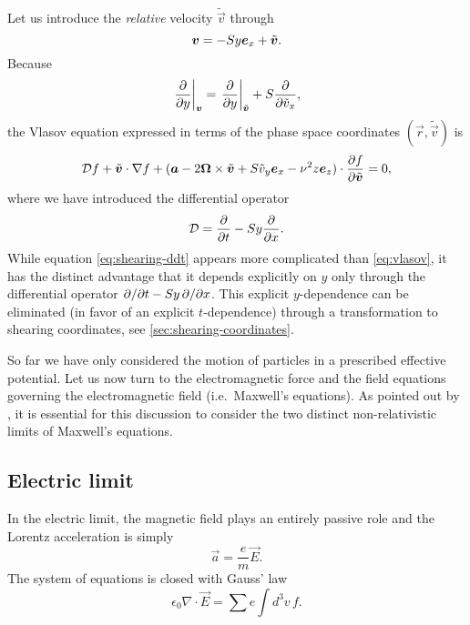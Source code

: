 \documentclass[aps,pre,notitlepage,amsmath,amssymb,amsfonts,nobibnotes,nofootinbib,superscriptaddress,onecolumn,a4paper,10pt]{revtex4-1}
\newcommand{\tvec}[1]{\tilde{\vec{#1}}}
\begin{document}
Let us introduce the \emph{relative} velocity $\tvec{v}$ through
\begin{equation}
  \label{eq:relative-velocity}
  \vec{v} = -Sy\ex + \tvec{v}.
\end{equation}
Because
\begin{equation}
  \left.\pder{}{y}\right|_{\vec{v}} =
  \left.\pder{}{y}\right|_{\tvec{v}} + S\pder{}{\tilde{v}_x},
\end{equation}
the Vlasov equation  expressed in terms of the phase
space coordinates $(\vec{r},\tvec{v})$ is
\begin{equation}
  \label{eq:vlasov-relative}
  \mathcal{D}f + \tilde{\vec{v}}\cdot\nabla f
  + (\vec{a} - 2\vec{\Omega}\times\tvec{v} + S\tilde{v}_y\ex - \nu^2 z\ez)
  \cdot\pder{f}{\tvec{v}} = 0,
\end{equation}
where we have introduced the differential operator
\begin{equation}
  \label{eq:shearing-ddt}
  \mathcal{D} = \frac{\partial}{\partial t} - Sy\frac{\partial}{\partial x}.
\end{equation}
While equation \cref{eq:shearing-ddt} appears more complicated than
\cref{eq:vlasov}, it has the distinct advantage that it depends explicitly on
$y$ only through the differential operator $\partial{}/\partial{t}-Sy\,\partial{}/\partial{x}$. This
explicit $y$-dependence can be eliminated (in favor of an explicit
$t$-dependence) through a transformation to shearing coordinates, see
\cref{sec:shearing-coordinates}.

So far we have only considered the motion of particles in a prescribed
effective potential. Let us now turn to the electromagnetic force and the
field equations governing the electromagnetic field (i.e.\ Maxwell's
equations). As pointed out by \citet{LeBellac1973}, it is essential for this
discussion to consider the two distinct non-relativistic limits of Maxwell's
equations.

\subsection{Electric limit}\label{sec:electric}

In the electric limit, the magnetic field plays an entirely passive role and
the Lorentz acceleration is simply
\begin{equation}
  \label{eq:electric-accel}
  \vec{a} = \frac{e}{m}\vec{E}.
\end{equation}
The system of equations is closed with Gauss' law
\begin{equation}
  \epsilon_0\nabla\cdot\vec{E} = \sum e\int\!d^3v\,f.
\end{equation}
\end{document}

